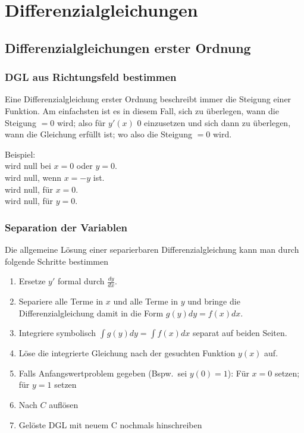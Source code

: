 \documentclass[12pt, a4paper]{scrreprt}
\begin{document}


\tableofcontents
\pagebreak

\setcounter{chapter}{13}
\chapter{Differenzialgleichungen}

\section{Differenzialgleichungen erster Ordnung}

\subsection{DGL aus Richtungsfeld bestimmen}
Eine Differenzialgleichung erster Ordnung beschreibt immer die Steigung einer Funktion. Am einfachsten ist es in diesem Fall, sich zu überlegen, wann die Steigung \(=0\) wird; also für \(y'(x)\) 0 einzusetzen und sich dann zu überlegen, wann die Gleichung erfüllt ist; wo also die Steigung \(=0\) wird.

Beispiel:\\[1em]
 wird null bei \(x = 0\) oder \(y = 0\).\\
 wird null, wenn \(x = -y\) ist.\\
 wird null, für \(x = 0\).\\
 wird null, für \(y = 0\).

\subsection{Separation der Variablen}

Die allgemeine Lösung einer separierbaren Differenzialgleichung kann man durch folgende Schritte bestimmen
\begin{enumerate}
\item Ersetze \(y'\) formal durch \(\frac{dy}{dx}\).
\item Separiere alle Terme in \(x\) und alle Terme in \(y\) und bringe die Differenzialgleichung damit in die Form \(g(y)dy=f(x)dx\).
\item Integriere symbolisch \(\int{g(y)dy} = \int{f(x)dx}\) separat auf beiden Seiten.
\item Löse die integrierte Gleichung nach der gesuchten Funktion \(y(x)\) auf.
\item Falls Anfangswertproblem gegeben (Bspw.\ sei \(y(0) = 1\)): Für \(x = 0\) setzen; für \(y = 1\) setzen
\item Nach \(C\) auflösen
\item Gelöste DGL mit neuem C nochmals hinschreiben
\end{enumerate}
\end{document}

